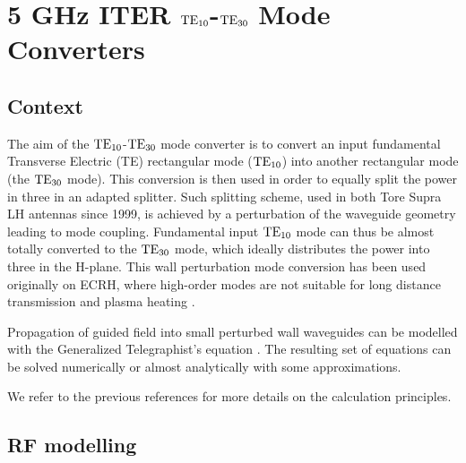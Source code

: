 \clearpage

\section{5 GHz ITER ${\mathrm{TE}}_{10}$-${\mathrm{TE}}_{30}$ Mode Converters}\label{sec:mode_converter}

\subsection{Context}
The aim of the ${\mathrm{TE}}_{10}$-${\mathrm{TE}}_{30}$ mode converter is to convert an input fundamental Transverse Electric (TE) rectangular mode (${\mathrm{TE}}_{10}$) into another rectangular mode (the ${\mathrm{TE}}_{30}$ mode). This conversion is then used in order to equally split the power in three in an adapted splitter. Such splitting scheme, used in both Tore Supra LH antennas since 1999, is achieved by a perturbation of the waveguide geometry leading to mode coupling. Fundamental input ${\mathrm{TE}}_{10}$ mode can thus be almost totally converted to the ${\mathrm{TE}}_{30}$ mode, which ideally distributes the power into three in the H-plane. This wall perturbation mode conversion has been used originally on ECRH, where high-order modes are not suitable for long distance transmission and plasma heating \cite{thumm1987-1, thumm2002}. 

Propagation of guided field into small perturbed wall waveguides can be modelled with the Generalized Telegraphist's equation . The resulting set of equations can be solved numerically  or almost analytically with some approximations\cite{unger1958, solymar1959}. 

We refer to the previous references for more details on the calculation principles. 

\subsection{RF modelling}
